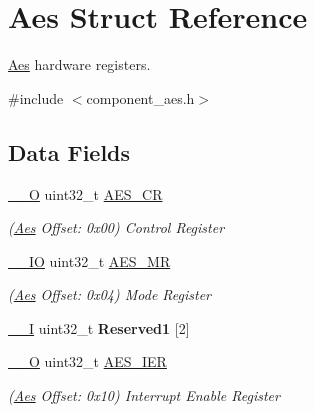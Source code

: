 \hypertarget{structAes}{}\section{Aes Struct Reference}
\label{structAes}


\mbox{\hyperlink{structAes}{Aes}} hardware registers.  




{\ttfamily \#include $<$component\+\_\+aes.\+h$>$}

\subsection*{Data Fields}
\begin{DoxyCompactItemize}
\item 
\mbox{\label{structAes_a8a5ebffbad0855e708ada3404ff75e64}} 
\mbox{\hyperlink{core__cm7_8h_a7e25d9380f9ef903923964322e71f2f6}{\+\_\+\+\_\+O}} uint32\+\_\+t \mbox{\hyperlink{structAes_a8a5ebffbad0855e708ada3404ff75e64}{A\+E\+S\+\_\+\+CR}}
\begin{DoxyCompactList}\small\item\em (\mbox{\hyperlink{structAes}{Aes}} Offset\+: 0x00) Control Register \end{DoxyCompactList}\item 
\mbox{\label{structAes_af70e9b6da74725f0dd68202f1a6ab3d1}} 
\mbox{\hyperlink{core__cm7_8h_aec43007d9998a0a0e01faede4133d6be}{\+\_\+\+\_\+\+IO}} uint32\+\_\+t \mbox{\hyperlink{structAes_af70e9b6da74725f0dd68202f1a6ab3d1}{A\+E\+S\+\_\+\+MR}}
\begin{DoxyCompactList}\small\item\em (\mbox{\hyperlink{structAes}{Aes}} Offset\+: 0x04) Mode Register \end{DoxyCompactList}\item 
\mbox{\label{structAes_a42e08852f42fe235f13c562c47e4976f}} 
\mbox{\hyperlink{core__cm7_8h_af63697ed9952cc71e1225efe205f6cd3}{\+\_\+\+\_\+I}} uint32\+\_\+t {\bfseries Reserved1} \mbox{[}2\mbox{]}
\item 
\mbox{\label{structAes_a9a9e674dac62a965ce57c024a391427e}} 
\mbox{\hyperlink{core__cm7_8h_a7e25d9380f9ef903923964322e71f2f6}{\+\_\+\+\_\+O}} uint32\+\_\+t \mbox{\hyperlink{structAes_a9a9e674dac62a965ce57c024a391427e}{A\+E\+S\+\_\+\+I\+ER}}
\begin{DoxyCompactList}\small\item\em (\mbox{\hyperlink{structAes}{Aes}} Offset\+: 0x10) Interrupt Enable Register \end{DoxyCompactList}\item 

\end{DoxyCompactItemize}
